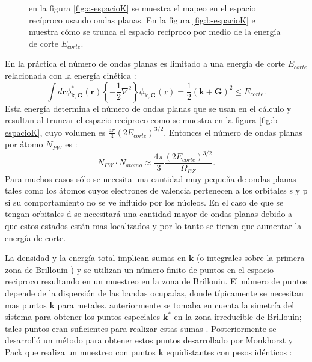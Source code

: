    \begin{figure}[!htb]
   	\centering
   \caption[Mapeo espacio rec\'iproco]{en la figura \ref{fig:a-espacioK} se muestra el mapeo en el espacio rec\'iproco usando ondas planas. En la figura \ref{fig:b-espacioK} e muestra c\'omo  se trunca el espacio rec\'iproco por medio de la energ\'ia de corte $E_{corte}$\cite{MB-2015}.}
   \label{fig:espacioK}
   \end{figure}
   En la pr\'actica el n\'umero de ondas planas es limitado a una energ\'ia de corte $E_{corte}$ relacionada con la energ\'ia cin\'etica \cite{MB-2015}:
   \begin{equation}
   \int d \pmb{r}  \phi_{\pmb{k},\pmb{G}}^* (\pmb{r}) \left\{-\frac{1}{2} \nabla^2 \right\} \phi_{\pmb{k},\pmb{G}} (\pmb{r}) = \frac{1}{2} (\pmb{k}+ \pmb{G})^2 \le E_{corte}. \label{ec:Ecut}
   \end{equation}
   Esta energ\'ia determina el n\'umero de ondas planas que se usan en el c\'alculo y resultan al truncar el espacio rec\'iproco como se muestra en la figura \ref{fig:b-espacioK}, cuyo volumen es $\frac{4 \pi }{3} (2 E_{corte})^{3/2}$. Entonces el n\'umero de ondas planas por \'atomo $N_{PW}$ es \cite{PhysRevB.61.4576}:
   \begin{equation}
   N_{PW}\cdot N_{atomo} \approx \frac{4 \pi }{3} \frac{(2E_{corte})^{3/2}}{\Omega_{BZ}}. \label{ec:NumAtomoPW}
   \end{equation}
   Para muchos casos s\'olo se necesita una cantidad muy peque\~na de ondas planas tales como los \'atomos cuyos electrones de valencia pertenecen a los orbitales s y p si su comportamiento no se ve influido por los n\'ucleos. En el caso de que se tengan orbitales d se necesitar\'a una cantidad mayor de ondas planas debido a que estos estados est\'an mas localizados y por lo tanto se tienen que aumentar la energ\'ia de corte.
   \newline
   \par  La densidad y la energ\'ia total implican sumas en $\pmb{k}$ (o integrales sobre la primera zona de Brillouin ) y  se utilizan un n\'umero finito de  puntos en el espacio reciproco  resultando en un muestreo en la zona de Brillouin. El n\'umero de puntos depende de la dispersi\'on de las bandas ocupadas, donde t\'ipicamente se necesitan mas puntos $\pmb{k}$ para metales. anteriormente se tomaba en  cuenta  la simetr\'ia del sistema para obtener los puntos especiales $\pmb{k}^*$ en la zona irreducible de Brillouin; tales puntos eran suficientes para realizar estas sumas \cite{MB-2015}. Posteriormente se desarroll\'o   un m\'etodo para obtener estos puntos desarrollado por Monkhorst y Pack que realiza un muestreo con puntos $\pmb{k}$ equidistantes con pesos id\'enticos \cite{PhysRevB.13.5188}:
